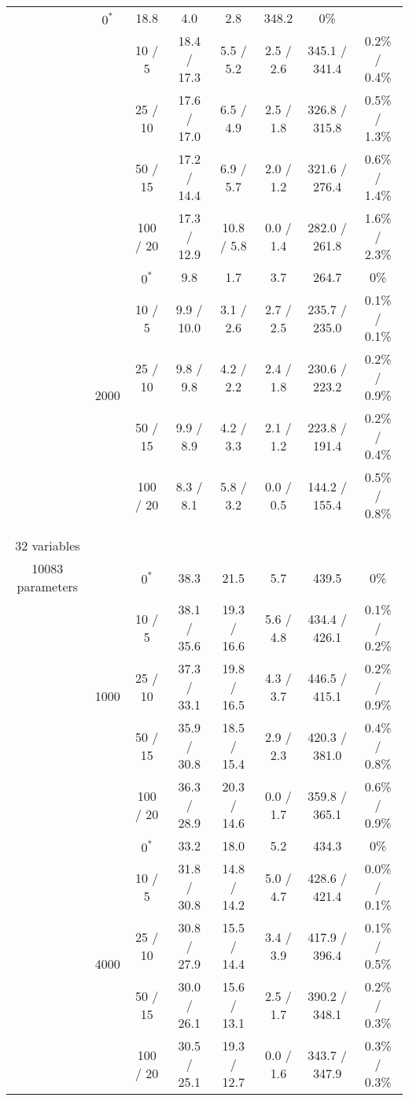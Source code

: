 \documentclass[twoside,11pt]{article}
\begin{document}
\begin{table}[H]
\begin{tabular}{ c | c | c || c | c | c | c | c  }
& $0^*$ & 18.8 & 4.0 & 2.8 & 348.2 & 0\% \\
& & 10 / 5 & 18.4 / 17.3 & 5.5 / 5.2 & 2.5 / 2.6 & 345.1 / 341.4 & 0.2\% / 0.4\% \\
& & 25 / 10 & 17.6 / 17.0 & 6.5 / 4.9 & 2.5 / 1.8 & 326.8 / 315.8 & 0.5\% / 1.3\% \\
& & 50 / 15 & 17.2 / 14.4 & 6.9 / 5.7 & 2.0 / 1.2 & 321.6 / 276.4 & 0.6\% / 1.4\% \\
& & 100 / 20 & 17.3 / 12.9 & 10.8 / 5.8 & 0.0 / 1.4 & 282.0 / 261.8 & 1.6\% / 2.3\% \\

\hhline{~|-|-||-|-|-|-|-} 
& \multirow{5}{*}{2000}

& $0^*$ & 9.8 & 1.7 & 3.7 & 264.7 & 0\% \\
& & 10 / 5 & 9.9 / 10.0 & 3.1 / 2.6 & 2.7 / 2.5 & 235.7 / 235.0 & 0.1\% / 0.1\% \\
& & 25 / 10 & 9.8 / 9.8 & 4.2 / 2.2 & 2.4 / 1.8 & 230.6 / 223.2 & 0.2\% / 0.9\% \\
& & 50 / 15 & 9.9 / 8.9 & 4.2 / 3.3 & 2.1 / 1.2 & 223.8 / 191.4 & 0.2\% / 0.4\% \\
& & 100 / 20 & 8.3 / 8.1 & 5.8 / 3.2 & 0.0 / 0.5 & 144.2 / 155.4 & 0.5\% / 0.8\% \\

\hhline{=|=|=||=|=|=|=|=}
\multirow{10}{*}{\thead{\textbf{water} \\ \\ 32 variables \\ 10083 parameters}} & \multirow{5}{*}{1000} 

& $0^*$ & 38.3 & 21.5 & 5.7 & 439.5 & 0\% \\
& & 10 / 5 & 38.1 / 35.6 & 19.3 / 16.6 & 5.6 / 4.8 & 434.4 / 426.1 & 0.1\% / 0.2\% \\
& & 25 / 10 & 37.3 / 33.1 & 19.8 / 16.5 & 4.3 / 3.7 & 446.5 / 415.1 & 0.2\% / 0.9\% \\
& & 50 / 15 & 35.9 / 30.8 & 18.5 / 15.4 & 2.9 / 2.3 & 420.3 / 381.0 & 0.4\% / 0.8\% \\
& & 100 / 20 & 36.3 / 28.9 & 20.3 / 14.6 & 0.0 / 1.7 & 359.8 / 365.1 & 0.6\% / 0.9\% \\

\hhline{~|-|-||-|-|-|-|-} 
& \multirow{5}{*}{4000}
& $0^*$ & 33.2 & 18.0 & 5.2 & 434.3 & 0\% \\
& & 10 / 5 & 31.8 / 30.8 & 14.8 / 14.2 & 5.0 / 4.7 & 428.6 / 421.4 & 0.0\% / 0.1\% \\
& & 25 / 10 & 30.8 / 27.9 & 15.5 / 14.4 & 3.4 / 3.9 & 417.9 / 396.4 & 0.1\% / 0.5\% \\
& & 50 / 15 & 30.0 / 26.1 & 15.6 / 13.1 & 2.5 / 1.7 & 390.2 / 348.1 & 0.2\% / 0.3\% \\
& & 100 / 20 & 30.5 / 25.1 & 19.3 / 12.7 & 0.0 / 1.6 & 343.7 / 347.9 & 0.3\% / 0.3\% \\


\end{tabular}
\end{table}
\end{document}
